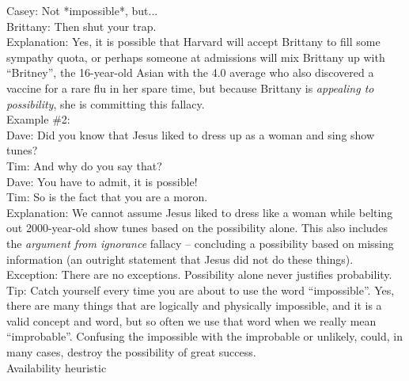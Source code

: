 \documentclass[a4paper,12pt,single,pdftex]{scrartcl}
\begin{document}
    
      Casey: Not *impossible*, but...
    \\

    
      Brittany: Then shut your trap.
    \\

    
      Explanation: Yes, it is possible that Harvard will accept Brittany to fill some sympathy quota, or perhaps someone at admissions will mix Brittany up with “Britney”, the 16-year-old Asian with the 4.0 average who also discovered a vaccine for a rare flu in her spare time, but because Brittany is {\it appealing to possibility}, she is committing this fallacy.
    \\

    
      Example \#2:
    \\

    
      Dave: Did you know that Jesus liked to dress up as a woman and sing show tunes?
    \\

    
      Tim: And why do you say that?
    \\

    
      Dave: You have to admit, it is possible!
    \\

    
      Tim: So is the fact that you are a moron.
    \\

    
      Explanation: We cannot assume Jesus liked to dress like a woman while belting out 2000-year-old show tunes based on the possibility alone. This also includes the {\it argument from ignorance} fallacy -- concluding a possibility based on missing information (an outright statement that Jesus did not do these things).
    \\

    
      Exception:  There are no exceptions. Possibility alone never justifies probability.
    \\

    
      Tip: Catch yourself every time you are about to use the word “impossible”.  Yes, there are many things that are logically and physically impossible, and it is a valid concept and word, but so often we use that word when we really mean  “improbable”.  Confusing the impossible with the improbable or unlikely, could, in many cases, destroy the possibility of great success.
    \\

  

Availability heuristic
    
\end{document}
